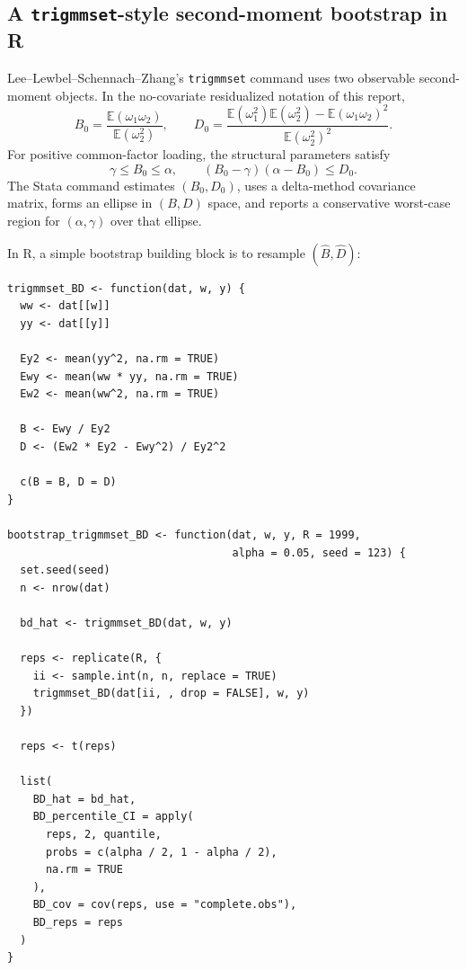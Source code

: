 \documentclass[11pt]{article}
\newcommand{\E}{\mathbb{E}}
\theoremstyle{plain}
\theoremstyle{definition}
\theoremstyle{remark}
\begin{document}
\subsection{A \texttt{trigmmset}-style second-moment bootstrap in R}
\label{subsec:trigmmset-bootstrap}

Lee--Lewbel--Schennach--Zhang's \texttt{trigmmset} command uses two observable
second-moment objects.  In the no-covariate residualized notation of this
report,
\begin{equation}
B_0=\frac{\E(\omega_1\omega_2)}{\E(\omega_2^2)},\qquad
D_0=\frac{\E(\omega_1^2)\E(\omega_2^2)-\E(\omega_1\omega_2)^2}{\E(\omega_2^2)^2}.
\label{eq:BD-consolidated}
\end{equation}
For positive common-factor loading, the structural parameters satisfy
\begin{equation}
\gamma\le B_0\le \alpha,
\qquad
(B_0-\gamma)(\alpha-B_0)\le D_0.
\label{eq:trigmmset-region-consolidated}
\end{equation}
The Stata command estimates $(B_0,D_0)$, uses a delta-method covariance matrix,
forms an ellipse in $(B,D)$ space, and reports a conservative worst-case region
for $(\alpha,\gamma)$ over that ellipse.

In R, a simple bootstrap building block is to resample $(\hat B,
\hat D)$:

\begin{verbatim}
trigmmset_BD <- function(dat, w, y) {
  ww <- dat[[w]]
  yy <- dat[[y]]

  Ey2 <- mean(yy^2, na.rm = TRUE)
  Ewy <- mean(ww * yy, na.rm = TRUE)
  Ew2 <- mean(ww^2, na.rm = TRUE)

  B <- Ewy / Ey2
  D <- (Ew2 * Ey2 - Ewy^2) / Ey2^2

  c(B = B, D = D)
}

bootstrap_trigmmset_BD <- function(dat, w, y, R = 1999,
                                   alpha = 0.05, seed = 123) {
  set.seed(seed)
  n <- nrow(dat)

  bd_hat <- trigmmset_BD(dat, w, y)

  reps <- replicate(R, {
    ii <- sample.int(n, n, replace = TRUE)
    trigmmset_BD(dat[ii, , drop = FALSE], w, y)
  })

  reps <- t(reps)

  list(
    BD_hat = bd_hat,
    BD_percentile_CI = apply(
      reps, 2, quantile,
      probs = c(alpha / 2, 1 - alpha / 2),
      na.rm = TRUE
    ),
    BD_cov = cov(reps, use = "complete.obs"),
    BD_reps = reps
  )
}
\end{verbatim}
\end{document}
